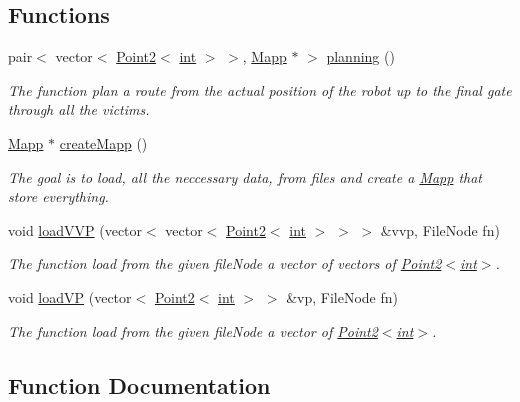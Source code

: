 \subsection*{Functions}
\begin{DoxyCompactItemize}
\item 
pair$<$ vector$<$ \mbox{\hyperlink{class_point2}{Point2}}$<$ \mbox{\hyperlink{draw_8hh_aa620a13339ac3a1177c86edc549fda9b}{int}} $>$ $>$, \mbox{\hyperlink{class_mapp}{Mapp}} $\ast$ $>$ \mbox{\hyperlink{planning_8hh_ad3e1a145dd1a47f23969c6f6f6d671eb}{planning}} ()
\begin{DoxyCompactList}\small\item\em The function plan a route from the actual position of the robot up to the final gate through all the victims. \end{DoxyCompactList}\item 
\mbox{\hyperlink{class_mapp}{Mapp}} $\ast$ \mbox{\hyperlink{planning_8hh_a7c7b2e381023697547786d663894435d}{create\+Mapp}} ()
\begin{DoxyCompactList}\small\item\em The goal is to load, all the neccessary data, from files and create a \mbox{\hyperlink{class_mapp}{Mapp}} that store everything. \end{DoxyCompactList}\item 
void \mbox{\hyperlink{planning_8hh_ad6ed6af027c9a35de0c872788d50c733}{load\+V\+VP}} (vector$<$ vector$<$ \mbox{\hyperlink{class_point2}{Point2}}$<$ \mbox{\hyperlink{draw_8hh_aa620a13339ac3a1177c86edc549fda9b}{int}} $>$ $>$ $>$ \&vvp, File\+Node fn)
\begin{DoxyCompactList}\small\item\em The function load from the given file\+Node a vector of vectors of \mbox{\hyperlink{class_point2}{Point2$<$int$>$}}. \end{DoxyCompactList}\item 
void \mbox{\hyperlink{planning_8hh_aa3a220a5ab5f16da550b786caa041f6b}{load\+VP}} (vector$<$ \mbox{\hyperlink{class_point2}{Point2}}$<$ \mbox{\hyperlink{draw_8hh_aa620a13339ac3a1177c86edc549fda9b}{int}} $>$ $>$ \&vp, File\+Node fn)
\begin{DoxyCompactList}\small\item\em The function load from the given file\+Node a vector of \mbox{\hyperlink{class_point2}{Point2$<$int$>$}}. \end{DoxyCompactList}\end{DoxyCompactItemize}


\subsection{Function Documentation}
\mbox{\label{planning_8hh_a7c7b2e381023697547786d663894435d}} 
